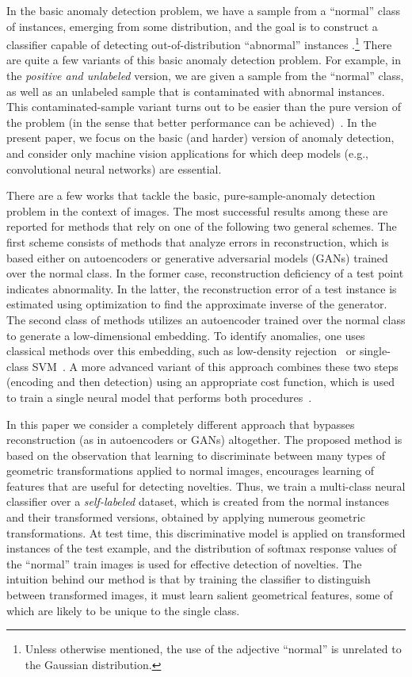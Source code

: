 \documentclass{article}
\begin{document}
	In the basic anomaly detection problem, we have a sample from a ``normal'' class of instances, emerging from some distribution, and the goal is to construct a classifier capable of detecting out-of-distribution ``abnormal'' 
	instances \cite{chandola2009anomaly}.\footnote{Unless otherwise mentioned, the use of the adjective ``normal'' is unrelated to the Gaussian distribution.} There are quite a few variants of this basic anomaly detection problem. For example, in the {\em positive and unlabeled} version, we are given a sample from the ``normal'' class, as well as an unlabeled sample that is contaminated with abnormal instances. This contaminated-sample variant turns out to be easier than the pure version of the problem (in the sense that better performance can be achieved)~\cite{blanchard2010semi}. In the present paper, we focus on the basic (and harder) version of anomaly detection, and consider only machine vision applications for which deep models (e.g., convolutional neural networks) are essential.
	
	There are a few works that tackle the basic, pure-sample-anomaly detection problem in the context of images. The most 
	successful results among these are reported for methods that rely on one of the following two general schemes.
	The first scheme consists of methods that analyze errors in reconstruction, which is  based either on autoencoders or generative adversarial models (GANs) trained over the normal class.
In the former case, reconstruction deficiency of a test point indicates abnormality. 
	In the latter, the reconstruction error of  a test instance is estimated using optimization to find the approximate inverse of the generator. The second class of methods utilizes an autoencoder trained over the normal class to generate a low-dimensional embedding. 
	To identify anomalies, one uses classical methods over this embedding, such as low-density rejection~\cite{el2007optimal} or single-class SVM~\cite{scholkopf2000support, tax2004support}. 
	A more advanced variant of this approach combines these two steps (encoding and then detection) using an appropriate cost function, which is used to train a single neural model that performs both procedures~\cite{ruff2018deep}.
	
	In this paper we consider a completely different approach that bypasses reconstruction (as in autoencoders or GANs) altogether.
	The proposed method is based on the observation that learning to discriminate between 
	many types of geometric transformations applied to normal images, encourages learning of features that are useful for detecting novelties. 
	Thus, we train a multi-class neural classifier over a {\em self-labeled} dataset, which is created from the normal instances and their transformed versions, obtained by applying 
	numerous geometric transformations. At test time, this discriminative model is applied on transformed instances of the test example, and the distribution of softmax response values of the ``normal'' train images is used for effective detection of novelties.
	The intuition behind our method is that by training the classifier to distinguish between transformed images, it must learn salient geometrical features, some of which are likely to
	be unique to the single class.
	
\end{document}
